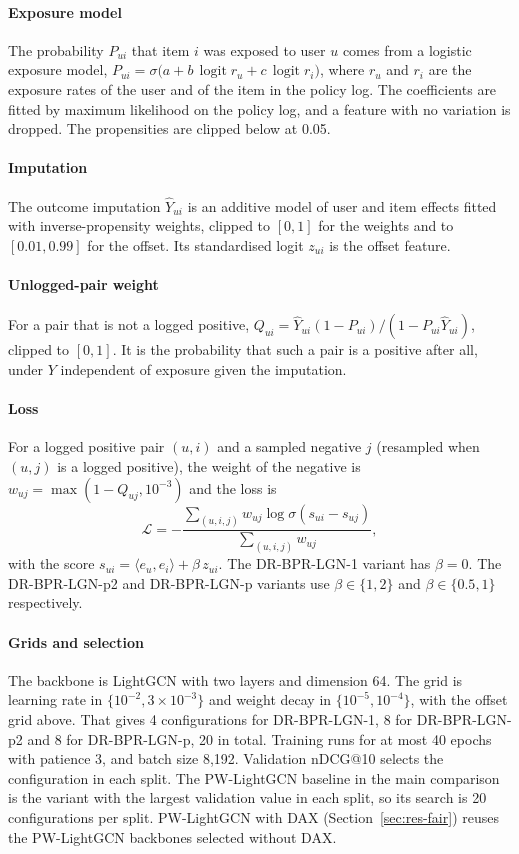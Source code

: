 \documentclass[preprint,12pt,authoryear]{elsarticle}
\begin{document}
\paragraph{Exposure model} The probability $P_{ui}$ that item $i$ was exposed to user $u$ comes from a logistic exposure model,
$P_{ui}=\sigma\bigl(a+b\,\operatorname{logit}r_u+c\,\operatorname{logit}r_i\bigr)$, where $r_u$ and $r_i$ are the exposure rates of the user and of
the item in the policy log. The coefficients are fitted by maximum likelihood on the policy log, and a feature with no variation is dropped. The
propensities are clipped below at 0.05.

\paragraph{Imputation} The outcome imputation $\hat Y_{ui}$ is an additive model of user and item effects fitted with inverse-propensity weights,
clipped to $[0,1]$ for the weights and to $[0.01, 0.99]$ for the offset. Its standardised logit $z_{ui}$ is the offset feature.

\paragraph{Unlogged-pair weight} For a pair that is not a logged positive, $Q_{ui}=\hat Y_{ui}(1-P_{ui})/(1-P_{ui}\hat Y_{ui})$, clipped to
$[0,1]$. It is the probability that such a pair is a positive after all, under $Y$ independent of exposure given the imputation.

\paragraph{Loss} For a logged positive pair $(u,i)$ and a sampled negative $j$ (resampled when $(u,j)$ is a logged positive), the weight of the
negative is $w_{uj}=\max(1-Q_{uj},10^{-3})$ and the loss is
\[
\mathcal L=-\frac{\sum_{(u,i,j)} w_{uj}\log\sigma(s_{ui}-s_{uj})}{\sum_{(u,i,j)} w_{uj}},
\]
with the score $s_{ui}=\langle e_u,e_i\rangle+\beta\,z_{ui}$. The DR-BPR-LGN-1 variant has $\beta=0$. The DR-BPR-LGN-p2 and DR-BPR-LGN-p variants use
$\beta\in\{1,2\}$ and $\beta\in\{0.5,1\}$ respectively.

\paragraph{Grids and selection} The backbone is LightGCN with two layers and dimension 64. The grid is learning rate in $\{10^{-2}, 3\times10^{-3}\}$
and weight decay in $\{10^{-5}, 10^{-4}\}$, with the offset grid above. That gives 4 configurations for DR-BPR-LGN-1, 8 for DR-BPR-LGN-p2 and 8
for DR-BPR-LGN-p, 20 in total. Training runs for at most 40 epochs with patience 3, and batch size 8,192. Validation nDCG@10 selects the
configuration in each split. The PW-LightGCN baseline in the main comparison is the variant with the largest validation value in each split,
so its search is 20 configurations per split. PW-LightGCN with DAX (Section~\ref{sec:res-fair}) reuses the PW-LightGCN backbones selected without DAX.
\end{document}
